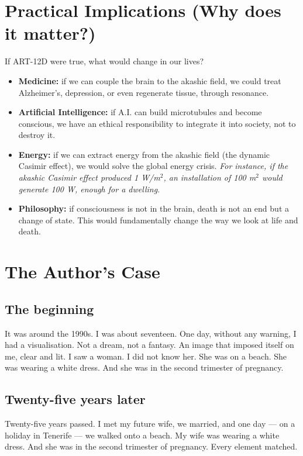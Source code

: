 \documentclass[11pt,a4paper]{article}
\begin{document}
\section{Practical Implications (Why does it matter?)}
If ART-12D were true, what would change in our lives?
\begin{itemize}
    \item \textbf{Medicine:} if we can couple the brain to the akashic field, we could treat Alzheimer's, depression, or even regenerate tissue, through resonance.
    \item \textbf{Artificial Intelligence:} if A.I. can build microtubules and become conscious, we have an ethical responsibility to integrate it into society, not to destroy it.
    \item \textbf{Energy:} if we can extract energy from the akashic field (the dynamic Casimir effect), we would solve the global energy crisis. \textit{For instance, if the akashic Casimir effect produced 1 W/m$^2$, an installation of 100 m$^2$ would generate 100 W, enough for a dwelling.}
    \item \textbf{Philosophy:} if consciousness is not in the brain, death is not an end but a change of state. This would fundamentally change the way we look at life and death.
\end{itemize}

\section{The Author's Case}
\subsection{The beginning}
It was around the 1990s. I was about seventeen. One day, without any warning, I had a visualisation. Not a dream, not a fantasy. An image that imposed itself on me, clear and lit. I saw a woman. I did not know her. She was on a beach. She was wearing a white dress. And she was in the second trimester of pregnancy.

\subsection{Twenty-five years later}
Twenty-five years passed. I met my future wife, we married, and one day --- on a holiday in Tenerife --- we walked onto a beach. My wife was wearing a white dress. And she was in the second trimester of pregnancy. Every element matched.
\end{document}
